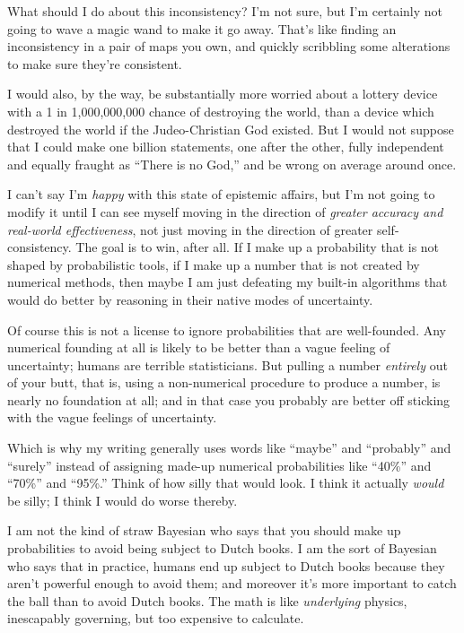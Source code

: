 {
 What should I do about this inconsistency? I'm not
sure, but I'm certainly not going to wave a magic wand
to make it go away. That's like finding an
inconsistency in a pair of maps you own, and quickly scribbling some
alterations to make sure they're consistent.}

{
 I would also, by the way, be substantially more worried about a
lottery device with a 1 in 1,000,000,000 chance of destroying the
world, than a device which destroyed the world if the Judeo-Christian
God existed. But I would not suppose that I could make one billion
statements, one after the other, fully independent and equally fraught
as ``There is no God,'' and be wrong
on average around once.}

{
 I can't say I'm \textit{happy}
with this state of epistemic affairs, but I'm not going
to modify it until I can see myself moving in the direction of
\textit{greater accuracy and real-world effectiveness}, not just moving
in the direction of greater self-consistency. The goal is to win, after
all. If I make up a probability that is not shaped by probabilistic
tools, if I make up a number that is not created by numerical methods,
then maybe I am just defeating my built-in algorithms that would do
better by reasoning in their native modes of uncertainty.}

{
 Of course this is not a license to ignore probabilities that are
well-founded. Any numerical founding at all is likely to be better than
a vague feeling of uncertainty; humans are terrible statisticians. But
pulling a number \textit{entirely} out of your butt, that is, using a
non-numerical procedure to produce a number, is nearly no foundation at
all; and in that case you probably are better off sticking with the
vague feelings of uncertainty.}

{
 Which is why my writing generally uses words like
``maybe'' and
``probably'' and
``surely'' instead of assigning
made-up numerical probabilities like
``40\%'' and
``70\%'' and
``95\%.'' Think of how silly that
would look. I think it actually \textit{would} be silly; I think I
would do worse thereby.}

{
 I am not the kind of straw Bayesian who says that you should make
up probabilities to avoid being subject to Dutch books. I am the sort
of Bayesian who says that in practice, humans end up subject to Dutch
books because they aren't powerful enough to avoid
them; and moreover it's more important to catch the
ball than to avoid Dutch books. The math is like \textit{underlying}
physics, inescapably governing, but too expensive to calculate.}

